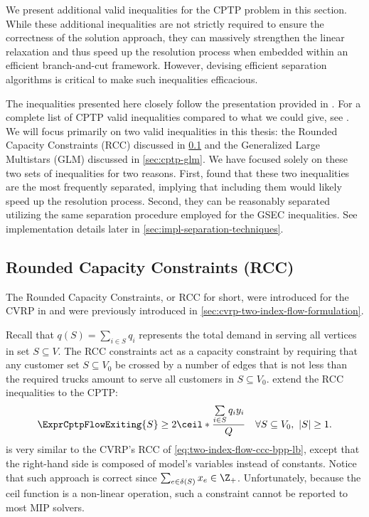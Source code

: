 We present additional valid inequalities for the CPTP problem in this section.
While these additional inequalities are not strictly required
to ensure the correctness of the solution approach,
they can massively strengthen the linear relaxation
and thus speed up the resolution process when embedded within an efficient branch-and-cut framework.
However, devising efficient separation algorithms is critical to make such inequalities efficacious.

The inequalities presented here closely follow the presentation provided in \textcite{jepsen2014}.
For a complete list of CPTP valid inequalities compared to what we could give, see \textcite{jepsen2014}.
We will focus primarily on two valid inequalities in this thesis:
the Rounded Capacity Constraints (RCC) discussed in \cref{sec:cptp-rcc}
and the Generalized Large Multistars (GLM) discussed in \cref{sec:cptp-glm}.
We have focused solely on these two sets of inequalities for two reasons.
First, \textcite{jepsen2014} found that these two inequalities
are the most frequently separated,
implying that including them would likely speed up the resolution process.
Second, they can be reasonably separated utilizing
the same separation procedure employed for the GSEC inequalities.
See implementation details later in \cref{sec:impl-separation-techniques}.

\subsection{Rounded Capacity Constraints (RCC)}
\label{sec:cptp-rcc}

The Rounded Capacity Constraints, or RCC for short,
were introduced for the CVRP in \textcite{laporte1983}
and were previously introduced in \cref{sec:cvrp-two-index-flow-formulation}.

Recall that $q(S) = \sum_{i \in S} q_i$ represents
the total demand in serving all vertices in set $S \subseteq V$.
The RCC constraints act as a capacity constraint
by requiring that any customer set $S \subseteq V_0$ be crossed by
a number of edges that is not less than the required trucks amount
to serve all customers in $S \subseteq V_0$.
\textcite{jepsen2014} extend the RCC inequalities to the CPTP:
\begin{equation}
	\label{eq:cptp-rcc-inequality-original}
	\ExprCptpFlowExiting{S} \ge 2 \ceil*{\frac{\sum\limits_{i \in S} q_i y_i}{Q}} \quad \forall S \subseteq V_0,\ |S| \ge 1.
\end{equation}
 is very similar
to the CVRP's RCC of \cref{eq:two-index-flow-ccc-bpp-lb},
except that the right-hand side is composed of model's variables instead of constants.
Notice that such approach is correct since $\sum_{e \in \delta(S)} x_e \in \Z_+$.
Unfortunately, because the ceil function is a non-linear operation,
such a constraint cannot be reported to most MIP solvers.

